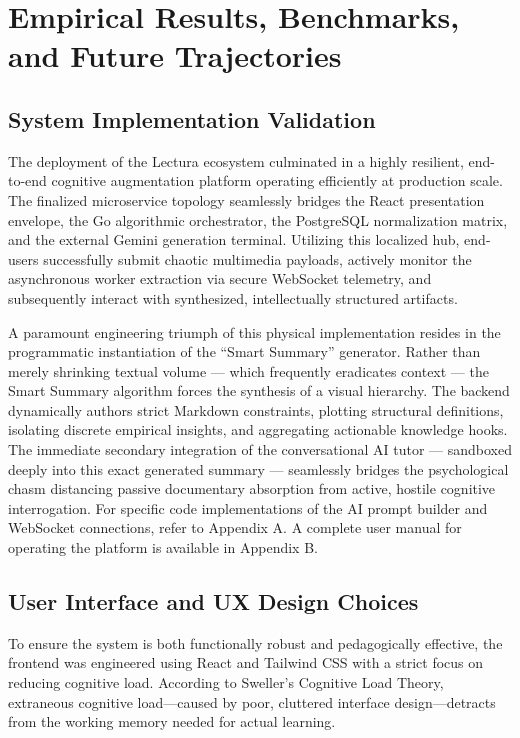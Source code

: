 \chapter{Empirical Results, Benchmarks, and Future Trajectories}
\label{chap:results_future}
\setlength{\parskip}{1em}

\section{System Implementation Validation}
The deployment of the Lectura ecosystem culminated in a highly resilient, end-to-end cognitive augmentation platform operating efficiently at production scale. The finalized microservice topology seamlessly bridges the React presentation envelope, the Go algorithmic orchestrator, the PostgreSQL normalization matrix, and the external Gemini generation terminal. Utilizing this localized hub, end-users successfully submit chaotic multimedia payloads, actively monitor the asynchronous worker extraction via secure WebSocket telemetry, and subsequently interact with synthesized, intellectually structured artifacts.

A paramount engineering triumph of this physical implementation resides in the programmatic instantiation of the ``Smart Summary'' generator. Rather than merely shrinking textual volume — which frequently eradicates context — the Smart Summary algorithm forces the synthesis of a visual hierarchy. The backend dynamically authors strict Markdown constraints, plotting structural definitions, isolating discrete empirical insights, and aggregating actionable knowledge hooks. The immediate secondary integration of the conversational AI tutor — sandboxed deeply into this exact generated summary — seamlessly bridges the psychological chasm distancing passive documentary absorption from active, hostile cognitive interrogation. For specific code implementations of the AI prompt builder and WebSocket connections, refer to Appendix A. A complete user manual for operating the platform is available in Appendix B.

\section{User Interface and UX Design Choices}
To ensure the system is both functionally robust and pedagogically effective, the frontend was engineered using React and Tailwind CSS with a strict focus on reducing cognitive load. According to Sweller's Cognitive Load Theory, extraneous cognitive load—caused by poor, cluttered interface design—detracts from the working memory needed for actual learning. 

